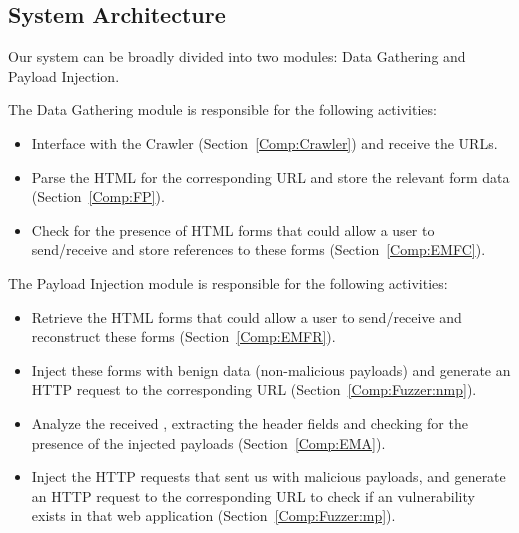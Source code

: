 \subsection{System Architecture}
\label{sys:arch}
Our system can be broadly divided into two modules: Data Gathering and Payload Injection.

The Data Gathering module is responsible for the following activities:
	\begin{itemize}
		\item Interface with the Crawler (Section~\ref{Comp:Crawler}) and receive the URLs.
		\item Parse the HTML for the corresponding URL and store the relevant form data (Section~\ref{Comp:FP}).
		\item Check for the presence of HTML forms that could allow a user to send/receive \email and store references to these forms (Section~\ref{Comp:EMFC}).
	\end{itemize}
    
	The Payload Injection module is responsible for the following activities:
	\begin{itemize}
		\item Retrieve the HTML forms that could allow a user to send/receive \email and reconstruct these forms (Section~\ref{Comp:EMFR}).
		\item Inject these forms with benign data (non-malicious payloads) and generate an HTTP request to the corresponding URL (Section~\ref{Comp:Fuzzer:nmp}).
		\item Analyze the received \emails, extracting the \email header fields and checking for the presence of the injected payloads (Section~\ref{Comp:EMA}).
		\item Inject the HTTP requests that sent us \emails with malicious payloads, and generate an HTTP request to the corresponding URL to check if an \ehi vulnerability exists in that web application (Section~\ref{Comp:Fuzzer:mp}).
	\end{itemize} 

